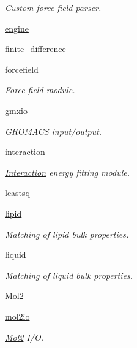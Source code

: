\begin{DoxyCompactItemize}
\begin{DoxyCompactList}\small\item\em Custom force field parser. \end{DoxyCompactList}\item 
\hyperlink{namespaceforcebalance_1_1engine}{engine}
\item 
\hyperlink{namespaceforcebalance_1_1finite__difference}{finite\-\_\-difference}
\item 
\hyperlink{namespaceforcebalance_1_1forcefield}{forcefield}
\begin{DoxyCompactList}\small\item\em Force field module. \end{DoxyCompactList}\item 
\hyperlink{namespaceforcebalance_1_1gmxio}{gmxio}
\begin{DoxyCompactList}\small\item\em G\-R\-O\-M\-A\-C\-S input/output. \end{DoxyCompactList}\item 
\hyperlink{namespaceforcebalance_1_1interaction}{interaction}
\begin{DoxyCompactList}\small\item\em \hyperlink{classforcebalance_1_1interaction_1_1Interaction}{Interaction} energy fitting module. \end{DoxyCompactList}\item 
\hyperlink{namespaceforcebalance_1_1leastsq}{leastsq}
\item 
\hyperlink{namespaceforcebalance_1_1lipid}{lipid}
\begin{DoxyCompactList}\small\item\em Matching of lipid bulk properties. \end{DoxyCompactList}\item 
\hyperlink{namespaceforcebalance_1_1liquid}{liquid}
\begin{DoxyCompactList}\small\item\em Matching of liquid bulk properties. \end{DoxyCompactList}\item 
\hyperlink{namespaceforcebalance_1_1Mol2}{Mol2}
\item 
\hyperlink{namespaceforcebalance_1_1mol2io}{mol2io}
\begin{DoxyCompactList}\small\item\em \hyperlink{namespaceforcebalance_1_1Mol2}{Mol2} I/\-O. \end{DoxyCompactList}\item 

\end{DoxyCompactItemize}
